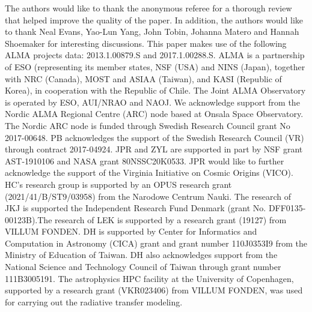 \documentclass{aa}
\begin{document}
\begin{acknowledgements}
The authors would like to thank the anonymous referee for a thorough review that helped improve the quality of the paper. In addition, the authors would like to thank Neal Evans, Yao-Lun Yang, John Tobin, Johanna Matero and Hannah Shoemaker for interesting discussions. This paper makes use of the following ALMA projects data: 2013.1.00879.S and 2017.1.00288.S. ALMA is a partnership of ESO (representing its member states, NSF (USA) and NINS (Japan), together with NRC (Canada), MOST and ASIAA (Taiwan), and KASI (Republic of Korea), in cooperation with the Republic of Chile. The Joint ALMA Observatory is operated by ESO, AUI/NRAO and NAOJ. 
We acknowledge support from the Nordic ALMA Regional Centre (ARC) node based
at Onsala Space Observatory. The Nordic ARC node is funded through Swedish Research Council grant No 2017-00648. PB acknowledges the support of the Swedish Research Council (VR) through contract 2017-04924. JPR and ZYL are supported in part by NSF grant AST-1910106 and NASA grant 80NSSC20K0533. JPR would like to further acknowledge the support of the Virginia Initiative on Cosmic Origins (VICO). HC's research group is supported by an OPUS research grant (2021/41/B/ST9/03958) from the Narodowe Centrum Nauki. The research of JKJ is supported the Independent Research Fund Denmark (grant No. DFF0135-00123B).The research of LEK is supported by a research grant (19127) from VILLUM FONDEN. DH is supported by Center for Informatics and Computation in Astronomy (CICA) grant and grant number 110J0353I9 from the Ministry of Education of Taiwan. DH also acknowledges support from the National Science and Technology Council of Taiwan through grant number 111B3005191. The astrophysics HPC facility at the University of Copenhagen, supported by a research grant (VKR023406) from VILLUM FONDEN, was used for carrying out the radiative transfer modeling.
\end{acknowledgements}
\newpage


\clearpage
%
\end{document}
